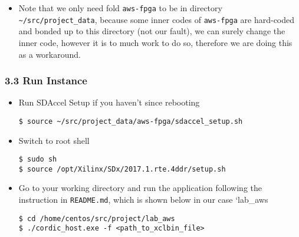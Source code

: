 \documentclass[]{article}
\begin{document}
\begin{itemize}
\item
  Note that we only need fold \texttt{aws-fpga} to be in directory
  \texttt{\textasciitilde{}/src/project\_data}, because some inner codes
  of \texttt{aws-fpga} are hard-coded and bonded up to this directory
  (not our fault), we can surely change the inner code, however it is to
  much work to do so, therefore we are doing this as a workaround.
\end{itemize}

\hypertarget{header-n488}{%
\subsubsection{3.3 Run Instance}\label{header-n488}}

\begin{itemize}
\item
  Run SDAccel Setup if you haven't since rebooting

\begin{verbatim}
$ source ~/src/project_data/aws-fpga/sdaccel_setup.sh
\end{verbatim}
\item
  Switch to root shell

\begin{verbatim}
$ sudo sh
$ source /opt/Xilinx/SDx/2017.1.rte.4ddr/setup.sh
\end{verbatim}
\item
  Go to your working directory and run the application following the
  instruction in \texttt{README.md}, which is shown below in our case
  `lab\_aws

\begin{verbatim}
$ cd /home/centos/src/project/lab_aws
$ ./cordic_host.exe -f <path_to_xclbin_file>
\end{verbatim}
\end{itemize}
\end{document}
